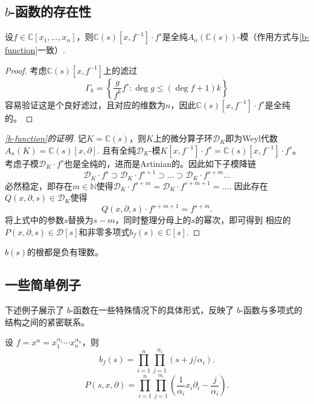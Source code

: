\subsection{$b$-函数的存在性}

\begin{proposition}
    设$f\in \mathbb{C}[x_1,\ldots,x_n]$，则$\mathbb{C}(s)[x,f^{-1}]\cdot f^s$是全纯$A_n(\mathbb{C}(s))$-模（作用方式与\ref{b-function}一致）.
    \begin{proof}
        考虑$\mathbb{C}(s)[x,f^{-1}]$上的滤过
        \begin{equation*}
            \Gamma_k=\left\{\frac{g}{f^k}f^s:\deg g \leq (\deg f +1)k\right\}
        \end{equation*}
        容易验证这是个良好滤过，且对应的维数为$n$，因此$\mathbb{C}(s)[x,f^{-1}]\cdot f^s$是全纯的。
    \end{proof}
\end{proposition}


\begin{proof}[\ref{b-function}的证明]
    记$K=\mathbb{C}(s)$，则$K$上的微分算子环$\mathcal{D}_K$即为Weyl代数$A_n(K)=\mathbb{C}(s)[x,\partial]$.
    且有全纯$\mathcal{D}_K$-模$K[x,f^{-1}]\cdot f^s=\mathbb{C}(s)[x,f^{-1}]\cdot f^s$。考虑子模$\mathcal{D}_K\cdot f^s$也是全纯的，进而是Artinian的。因此如下子模降链
    \begin{equation*}
        \mathcal{D}_K\cdot f^s\supset \mathcal{D}_K\cdot f^{s+1}\supset \ldots \supset \mathcal{D}_K\cdot f^{s+m} \ldots
    \end{equation*}
    必然稳定，即存在$m\in \mathbb{N}$使得$\mathcal{D}_K\cdot f^{s+m}=\mathcal{D}_K\cdot f^{s+m+1}=\ldots $.
    因此存在$Q(x,\partial,s)\in \mathcal{D}_K$使得
    \begin{equation*}
        Q(x,\partial,s)\cdot f^{s+m+1}=f^{s+m}.
    \end{equation*}
    将上式中的参数$s$替换为$s-m$，同时整理分母上的$s$的幂次，即可得到
    相应的$P(x,\partial,s)\in \mathcal{D}[s]$和非零多项式$b_f(s)\in \mathbb{C}[s]$.
\end{proof}



\begin{theorem}
    $b(s)$的根都是负有理数。
\end{theorem}



\subsection{一些简单例子}
下述例子展示了 $b$-函数在一些特殊情况下的具体形式，反映了 $b$-函数与多项式的结构之间的紧密联系。
\begin{example}[单项式]
    设 $f=x^\alpha =x_1^{\alpha_1}\cdots x_n^{\alpha_n}$，则
    \begin{equation*}
        b_f(s) = \prod_{i=1}^n \prod_{j=1}^{\alpha_i} (s + j/\alpha_i).
    \end{equation*}
    \begin{equation*}
        P(s,x,\partial) = \prod_{i=1}^n \prod_{j=1}^{\alpha_i} \left(\frac{1}{\alpha_i} x_i \partial_i - \frac{j}{\alpha_i}\right).
    \end{equation*}
\end{example}

